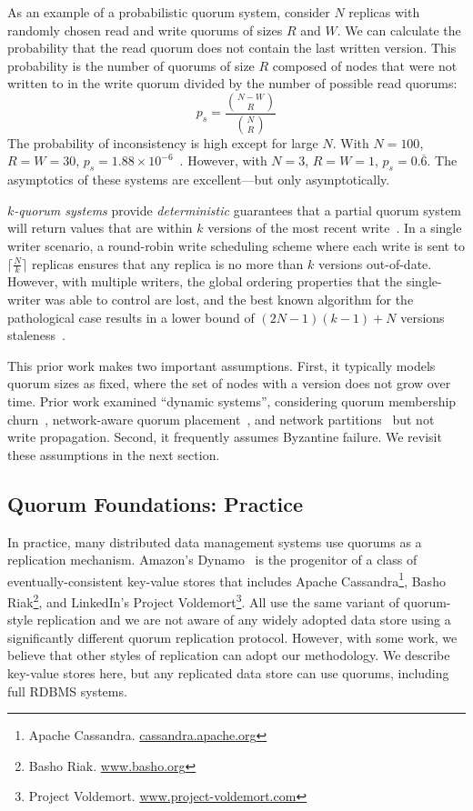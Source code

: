 \documentclass{vldb}
\newcommand{\subsectionskip}{-0em}
\begin{document}
As an example of a probabilistic quorum system, consider $N$ replicas
with randomly chosen read and write quorums of sizes $R$ and $W$. We
can calculate the probability that the read quorum does not contain
the last written version. This probability is the number of quorums of
size $R$ composed of nodes that were not written to in the write
quorum divided by the number of possible read quorums:
\begin{equation}
\label{eq:prob-strict}
p_{s}=\frac{{N-W \choose R}}{{N \choose R}}
\end{equation}
The probability of inconsistency is high except for large $N$.  With
$N=100$, $R=W=30$, $p_{s} = 1.88 \times
10^{-6}$~\cite{non-strict}.  However, with $N=3$, $R=W=1$, $p_{s}
= 0.\overline{6}$.  The asymptotics of these systems are
excellent---but only asymptotically.

\textit{$k$-quorum systems} provide \textit{deterministic} guarantees
that a partial quorum system will return values that are within $k$
versions of the most recent write~\cite{non-strict}.  In a single
writer scenario, a round-robin write scheduling scheme where each
write is sent to $\lceil\frac{N}{k}\rceil$ replicas ensures that any
replica is no more than $k$ versions out-of-date.  However, with
multiple writers, the global ordering properties that the
single-writer was able to control are lost, and the best known
algorithm for the pathological case results in a lower bound of
$(2N-1)(k-1)+N$ versions staleness~\cite{multi-k-quorum}.

This prior work makes two important assumptions. First, it typically
models quorum sizes as fixed, where the set of nodes with a version
does not grow over time.  Prior work examined ``dynamic systems'',
considering quorum membership churn~\cite{prob-quorum-dynamic},
network-aware quorum placement~\cite{delay-quorum, quorum-placement},
and network partitions~\cite{partitionedquorum} but not write
propagation. Second, it frequently assumes Byzantine failure.  We
revisit these assumptions in the next section.

\vspace{\subsectionskip}\subsection{Quorum Foundations: Practice}
\label{sec:practice}

In practice, many distributed data management systems use quorums as a
replication mechanism. Amazon's Dynamo~\cite{dynamo} is the progenitor
of a class of eventually-consistent key-value stores that includes
Apache Cassandra\footnote{Apache Cassandra.
  \url{cassandra.apache.org}}, Basho Riak\footnote{Basho Riak.
  \url{www.basho.org}}, and LinkedIn's Project
Voldemort\footnote{Project Voldemort.
  \url{www.project-voldemort.com}}.  All use the same variant of
quorum-style replication and we are not aware of any widely adopted
data store using a significantly different quorum replication
protocol.  However, with some work, we believe that other styles of
replication can adopt our methodology.  We describe key-value stores
here, but any replicated data store can use quorums, including full
RDBMS systems.
\end{document}
